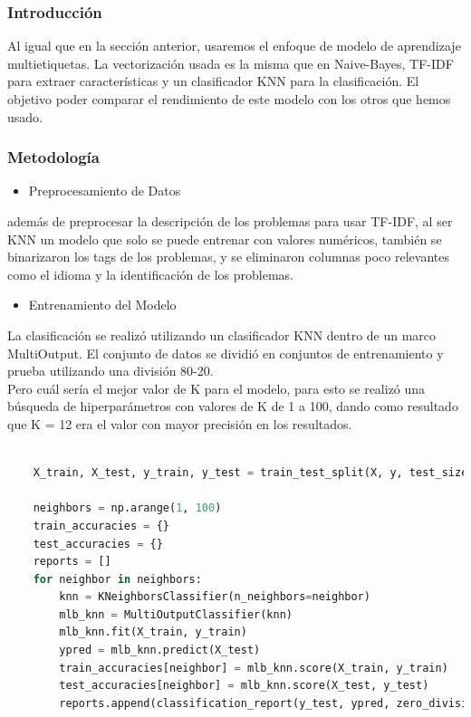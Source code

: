 \documentclass{article}
\begin{document}
\subsubsection{Introducción}
Al igual que en la sección anterior, usaremos el enfoque de modelo de aprendizaje multietiquetas. La vectorización usada es la misma que en Naive-Bayes, TF-IDF para extraer características y un clasificador KNN para la clasificación. El objetivo poder comparar el rendimiento de este modelo con los otros que hemos usado.

\subsubsection{Metodología}
\begin{itemize}
    \item Preprocesamiento de Datos
\end{itemize}
además de preprocesar la descripción de los problemas para usar TF-IDF, al ser KNN un modelo que solo se puede entrenar con valores numéricos, también se binarizaron los tags de los problemas, y se eliminaron columnas poco relevantes como el idioma y la identificación de los problemas.

\begin{itemize}
    \item Entrenamiento del Modelo
\end{itemize}
La clasificación se realizó utilizando un clasificador KNN dentro de un marco MultiOutput. El conjunto de datos se dividió en conjuntos de entrenamiento y prueba utilizando una división 80-20.\\ 
Pero cuál sería el mejor valor de K para el modelo, para esto se realizó una búsqueda de hiperparámetros con valores de K de 1 a 100, dando como resultado que K = 12 era el valor con mayor precisión en los resultados.

\begin{lstlisting}[language=Python, caption=KNN]
    
    X_train, X_test, y_train, y_test = train_test_split(X, y, test_size=0.2, random_state=42)
    
    neighbors = np.arange(1, 100)
    train_accuracies = {}
    test_accuracies = {}
    reports = []
    for neighbor in neighbors:
        knn = KNeighborsClassifier(n_neighbors=neighbor)
        mlb_knn = MultiOutputClassifier(knn)
        mlb_knn.fit(X_train, y_train)
        ypred = mlb_knn.predict(X_test) 
        train_accuracies[neighbor] = mlb_knn.score(X_train, y_train)
        test_accuracies[neighbor] = mlb_knn.score(X_test, y_test)
        reports.append(classification_report(y_test, ypred, zero_division = 0))
    \end{lstlisting}
\end{document}

